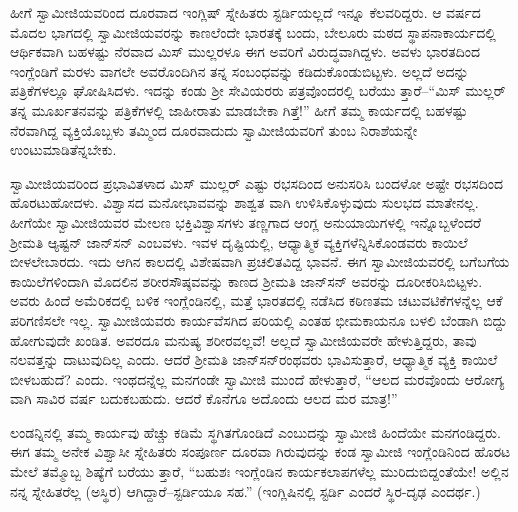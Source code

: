 ಹೀಗೆ ಸ್ವಾಮೀಜಿಯವರಿಂದ ದೂರವಾದ ಇಂಗ್ಲಿಷ್ ಸ್ನೇಹಿತರು ಸ್ಟರ್ಡಿಯಲ್ಲದೆ ಇನ್ನೂ ಕೆಲವರಿದ್ದರು. ಆ ವರ್ಷದ ಮೊದಲ ಭಾಗದಲ್ಲಿ ಸ್ವಾಮೀಜಿಯವರನ್ನು ಕಾಣಲೆಂದೇ ಭಾರತಕ್ಕೆ ಬಂದು, ಬೇಲೂರು ಮಠದ ಸ್ಥಾಪನಾಕಾರ್ಯದಲ್ಲಿ ಆರ್ಥಿಕವಾಗಿ ಬಹಳಷ್ಟು ನೆರವಾದ ಮಿಸ್ ಮುಲ್ಲರಳೂ ಈಗ ಅವರಿಗೆ ವಿರುದ್ಧವಾಗಿದ್ದಳು. ಅವಳು ಭಾರತದಿಂದ ಇಂಗ್ಲೆಂಡಿಗೆ ಮರಳು ವಾಗಲೇ ಅವರೊಂದಿಗಿನ ತನ್ನ ಸಂಬಂಧವನ್ನು ಕಡಿದುಕೊಂಡುಬಿಟ್ಟಳು. ಅಲ್ಲದೆ ಅದನ್ನು ಪತ್ರಿಕೆಗಳಲ್ಲೂ ಘೋಷಿಸಿದಳು. ಇದನ್ನು ಕಂಡು ಶ್ರೀ ಸೇವಿಯರರು ಪತ್ರವೊಂದರಲ್ಲಿ ಬರೆಯು ತ್ತಾರೆ–“ಮಿಸ್ ಮುಲ್ಲರ್ ತನ್ನ ಮೂರ್ಖತನವನ್ನು ಪತ್ರಿಕೆಗಳಲ್ಲಿ ಜಾಹೀರಾತು ಮಾಡಬೇಕಾ ಗಿತ್ತೆ!” ಹೀಗೆ ತಮ್ಮ ಕಾರ್ಯದಲ್ಲಿ ಬಹಳಷ್ಟು ನೆರವಾಗಿದ್ದ ವ್ಯಕ್ತಿಯೊಬ್ಬಳು ತಮ್ಮಿಂದ ದೂರವಾದುದು ಸ್ವಾಮೀಜಿಯವರಿಗೆ ತುಂಬ ನಿರಾಶೆಯನ್ನೇ ಉಂಟುಮಾಡಿತೆನ್ನಬೇಕು.

ಸ್ವಾಮೀಜಿಯವರಿಂದ ಪ್ರಭಾವಿತಳಾದ ಮಿಸ್ ಮುಲ್ಲರ್ ಎಷ್ಟು ರಭಸದಿಂದ ಅನುಸರಿಸಿ ಬಂದಳೋ ಅಷ್ಟೇ ರಭಸದಿಂದ ಹೊರಟುಹೋದಳು. ವಿಶ್ವಾಸದ ಮನೋಭಾವವನ್ನು ಶಾಶ್ವತ ವಾಗಿ ಉಳಿಸಿಕೊಳ್ಳುವುದು ಸುಲಭದ ಮಾತೇನಲ್ಲ. ಹೀಗೆಯೇ ಸ್ವಾಮೀಜಿಯವರ ಮೇಲಣ ಭಕ್ತಿವಿಶ್ವಾಸಗಳು ತಣ್ಣಗಾದ ಆಂಗ್ಲ ಅನುಯಾಯಿಗಳಲ್ಲಿ ಇನ್ನೊಬ್ಬಳೆಂದರೆ ಶ್ರೀಮತಿ ಆ್ಯಷ್ಟನ್ ಜಾನ್​ಸನ್ ಎಂಬವಳು. ಇವಳ ದೃಷ್ಟಿಯಲ್ಲಿ, ಆಧ್ಯಾತ್ಮಿಕ ವ್ಯಕ್ತಿಗಳೆನ್ನಿಸಿಕೊಂಡವರು ಕಾಯಿಲೆ ಬೀಳಲೇಬಾರದು. ಇದು ಆಗಿನ ಕಾಲದಲ್ಲಿ ವಿಶೇಷವಾಗಿ ಪ್ರಚಲಿತವಿದ್ದ ಭಾವನೆ. ಈಗ ಸ್ವಾಮೀಜಿಯವರಲ್ಲಿ ಬಗೆಬಗೆಯ ಕಾಯಿಲೆಗಳಿಂದಾಗಿ ಮೊದಲಿನ ಶರೀರಸೌಷ್ಠವವನ್ನು ಕಾಣದ ಶ್ರೀಮತಿ ಜಾನ್​ಸನ್ ಅವರನ್ನು ದೂರೀಕರಿಸಿಬಿಟ್ಟಳು. ಅವರು ಹಿಂದೆ ಅಮೆರಿಕದಲ್ಲಿ ಬಳಿಕ ಇಂಗ್ಲೆಂಡಿನಲ್ಲಿ, ಮತ್ತೆ ಭಾರತದಲ್ಲಿ ನಡೆಸಿದ ಕಠಿಣತಮ ಚಟುವಟಿಕೆಗಳನ್ನೆಲ್ಲ ಆಕೆ ಪರಿಗಣಿಸಲೇ ಇಲ್ಲ. ಸ್ವಾಮೀಜಿಯವರು ಕಾರ್ಯವೆಸಗಿದ ಪರಿಯಲ್ಲಿ ಎಂತಹ ಭೀಮಕಾಯನೂ ಬಳಲಿ ಬೆಂಡಾಗಿ ಬಿದ್ದು ಹೋಗುವುದೇ ಖಂಡಿತ. ಅವರದೂ ಮನುಷ್ಯ ಶರೀರವಲ್ಲವೆ! ಅಲ್ಲದೆ ಸ್ವಾಮೀಜಿಯವರೇ ಹೇಳುತ್ತಿದ್ದರು, ತಾವು ನಲವತ್ತನ್ನು ದಾಟುವುದಿಲ್ಲ ಎಂದು. ಆದರೆ ಶ್ರೀಮತಿ ಜಾನ್​ಸನ್​ರಂಥವರು ಭಾವಿಸುತ್ತಾರೆ, ಆಧ್ಯಾತ್ಮಿಕ ವ್ಯಕ್ತಿ ಕಾಯಿಲೆ ಬೀಳಬಹುದೆ? ಎಂದು. ಇಂಥದನ್ನೆಲ್ಲ ಮನಗಂಡೇ ಸ್ವಾಮೀಜಿ ಮುಂದೆ ಹೇಳುತ್ತಾರೆ, “ಆಲದ ಮರವೊಂದು ಆರೋಗ್ಯ ವಾಗಿ ಸಾವಿರ ವರ್ಷ ಬದುಕಬಹುದು. ಆದರೆ ಕೊನೆಗೂ ಅದೊಂದು ಆಲದ ಮರ ಮಾತ್ರ!”

ಲಂಡನ್ನಿನಲ್ಲಿ ತಮ್ಮ ಕಾರ್ಯವು ಹೆಚ್ಚು ಕಡಿಮೆ ಸ್ಥಗಿತಗೊಂಡಿದೆ ಎಂಬುದನ್ನು ಸ್ವಾಮೀಜಿ ಹಿಂದೆಯೇ ಮನಗಂಡಿದ್ದರು. ಈಗ ತಮ್ಮ ಅನೇಕ ವಿಶ್ವಾಸೀ ಸ್ನೇಹಿತರು ಸಂಪೂರ್ಣ ದೂರವಾ ಗಿರುವುದನ್ನು ಕಂಡ ಸ್ವಾಮೀಜಿ ಇಂಗ್ಲೆಂಡಿನಿಂದ ಹೊರಟ ಮೇಲೆ ತಮ್ಮೊಬ್ಬ ಶಿಷ್ಯೆಗೆ ಬರೆಯು ತ್ತಾರೆ, “ಬಹುಶಃ ಇಂಗ್ಲೆಂಡಿನ ಕಾರ್ಯಕಲಾಪಗಳೆಲ್ಲ ಮುರಿದುಬಿದ್ದಂತೆಯೇ! ಅಲ್ಲಿನ ನನ್ನ ಸ್ನೇಹಿತರೆಲ್ಲ  (ಅಸ್ಥಿರ) ಆಗಿದ್ದಾರೆ–ಸ್ಟರ್ಡಿಯೂ ಸಹ.” (ಇಂಗ್ಲಿಷಿನಲ್ಲಿ ಸ್ಟರ್ಡಿ ಎಂದರೆ ಸ್ಥಿರ-ದೃಢ ಎಂದರ್ಥ.)

